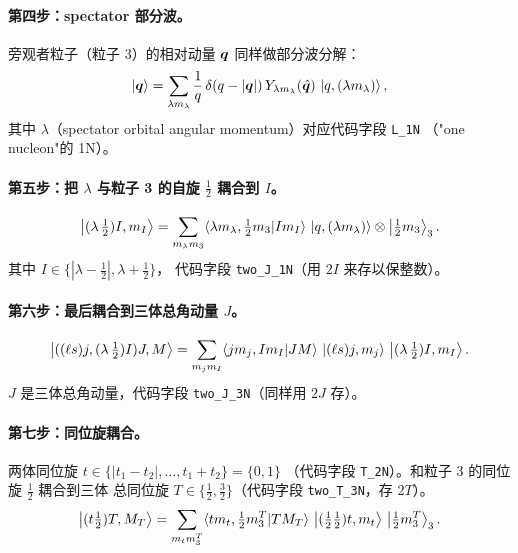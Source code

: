 \paragraph{第四步：spectator 部分波。}
旁观者粒子（粒子 3）的相对动量 \(\bm{q}\) 同样做部分波分解：
\begin{equation}
\label{eq:ch03-q-pw}
\ket{\bm{q}}
= \sum_{\lambda m_\lambda} \frac{1}{q}\,\delta(q - |\bm{q}|)\,
  Y_{\lambda m_\lambda}(\hat{\bm{q}})\,
  \ket{q, (\lambda m_\lambda)},
\end{equation}
其中 \(\lambda\)（spectator orbital angular momentum）对应代码字段 \verb|L_1N|
（"one nucleon"的 1N）。

\paragraph{第五步：把 \(\lambda\) 与粒子 3 的自旋 \(\tfrac{1}{2}\) 耦合到 \(I\)。}
\begin{equation}
\label{eq:ch03-spectator-I}
\ket{(\lambda\,\tfrac{1}{2}) I, m_I}
= \sum_{m_\lambda m_3} \langle \lambda m_\lambda, \tfrac{1}{2} m_3 | I m_I \rangle\,
  \ket{q, (\lambda m_\lambda)} \otimes \ket{\tfrac{1}{2} m_3}_3.
\end{equation}
其中 \(I \in \{|\lambda - \tfrac{1}{2}|, \lambda + \tfrac{1}{2}\}\)，
代码字段 \verb|two_J_1N|（用 \(2I\) 来存以保整数）。

\paragraph{第六步：最后耦合到三体总角动量 \(J\)。}
\begin{equation}
\label{eq:ch03-total-J}
\ket{((\ell s) j, (\lambda\,\tfrac{1}{2}) I) J, M}
= \sum_{m_j m_I} \langle j m_j, I m_I | J M \rangle\,
  \ket{(\ell s) j, m_j}\,\ket{(\lambda\,\tfrac{1}{2}) I, m_I}.
\end{equation}
\(J\) 是三体总角动量，代码字段 \verb|two_J_3N|（同样用 \(2J\) 存）。

\paragraph{第七步：同位旋耦合。}
两体同位旋
\(t \in \{|t_1 - t_2|, \ldots, t_1 + t_2\} = \{0, 1\}\)
（代码字段 \verb|T_2N|）。和粒子 3 的同位旋 \(\tfrac{1}{2}\) 耦合到三体
总同位旋 \(T \in \{\tfrac{1}{2}, \tfrac{3}{2}\}\)（代码字段
\verb|two_T_3N|，存 \(2T\)）。
\begin{equation}
\label{eq:ch03-iso-couple}
\ket{(t \tfrac{1}{2}) T, M_T}
= \sum_{m_t m_3^T} \langle t m_t, \tfrac{1}{2} m_3^T | T M_T \rangle\,
  \ket{(\tfrac{1}{2}\tfrac{1}{2}) t, m_t}\,\ket{\tfrac{1}{2} m_3^T}_3.
\end{equation}

